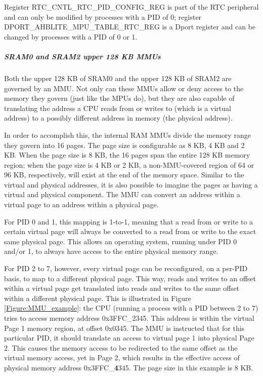 Register RTC\_CNTL\_RTC\_PID\_CONFIG\_REG is part of the RTC peripheral and can only be modified by processes with a PID of 0; register DPORT\_AHBLITE\_MPU\_TABLE\_RTC\_REG is a Dport register and can be changed by processes with a PID of 0 or 1.


\subparagraph{SRAM0 and SRAM2 upper 128 KB MMUs}

Both the upper 128 KB of SRAM0 and the upper 128 KB of SRAM2 are governed by an MMU. Not only can these MMUs allow or deny access to the memory they govern (just like the MPUs do), but they are also capable of translating the address a CPU reads from or writes to (which is a virtual address) to a possibly different address in memory (the physical address).

In order to accomplish this, the internal RAM MMUs divide the memory range they govern into 16 pages. The page size is configurable as 8 KB, 4 KB and 2 KB. When the page size is 8 KB, the 16 pages span the entire 128 KB memory region; when the page size is 4 KB or 2 KB, a non-MMU-covered region of 64 or 96 KB, respectively, will exist at the end of the memory space. Similar to the virtual and physical addresses, it is also possible to imagine the pages as having a virtual and physical component. The MMU can convert an address within a virtual page to an address within a physical page.

For PID 0 and 1, this mapping is 1-to-1, meaning that a read from or write to a certain virtual page will always be converted to a read from or write to the exact same physical page. This allows an operating system, running under PID 0 and/or 1, to always have access to the entire physical memory range.

For PID 2 to 7, however, every virtual page can be reconfigured, on a per-PID basis, to map to a different physical page. This way, reads and writes to an offset within a virtual page get translated into reads and writes to the same offset within a different physical page. This is illustrated in Figure \ref{Figure:MMU_example}: the CPU (running a process with a PID between 2 to 7) tries to access memory address 0x3FFC\_2345. This address is within the virtual Page 1 memory region, at offset 0x0345. The MMU is instructed that for this particular PID, it should translate an access to virtual page 1 into physical Page 2. This causes the memory access to be redirected to the same offset as the virtual memory access, yet in Page 2, which results in the effective access of physical memory address 0x3FFC\_\textbf{4}345. The page size in this example is 8 KB.


